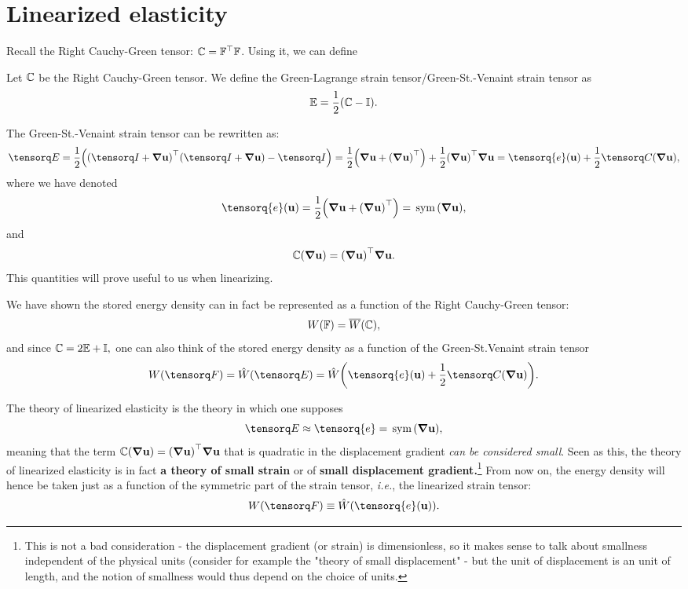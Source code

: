 \documentclass[11pt]{scrartcl} %
\begin{document}
\section{Linearized elasticity}
\label{sec:linearized_elasticity}

Recall the Right Cauchy-Green tensor: $\mathbb{C} = \mathbb{F}^\top\mathbb{F}$. Using it, we can define

\begin{theorem}
    Let $\mathbb{C}$ be the Right Cauchy-Green tensor. We define the Green-Lagrange strain tensor/Green-St.-Venaint strain tensor as
    \[
	    \mathbb{E} = \frac{1}{2}\qty(\mathbb{C} - \mathbb{I}).
    \]
\end{theorem}
\begin{remark}
    The Green-St.-Venaint strain tensor can be rewritten as:
    \[
	    \gsv = \frac{1}{2}\qty(\transpose{\qty(\identity+\grad \vb{u})}\qty(\identity + \grad \vb{u})- \identity) = \frac{1}{2}\qty(\grad \vb{u}+\transpose{\qty(\grad \vb{u})})+ \frac{1}{2}\transpose{\qty(\grad \vb{u})}\grad \vb{u} = \tensorq{e}\qty(\vb{u}) + \frac{1}{2}\rcg\qty(\grad \vb{u}),
    \]
    where we have denoted
    \[
	    \tensorq{e}\qty(\vb{u}) = \frac{1}{2}\qty(\grad \vb{u} + \transpose{\qty(\grad \vb{u})}) = \, \text{sym} \,\qty(\grad \vb{u}),
    \]
    and
    \[
	    \mathbb{C}\qty(\grad \vb{u}) = \qty(\grad \vb{u})^\top\grad \vb{u}.
    \]
    This quantities will prove useful to us when linearizing.
\end{remark}
We have shown the stored energy density can in fact be represented as a function of the Right Cauchy-Green tensor:
\[
	W\qty(\mathbb{F}) = \overline{W}\qty(\mathbb{C}),
\]
and since $\mathbb{C} = 2 \mathbb{E} + \mathbb{I},$ one can also think of the stored energy density as a function of the Green-St.Venaint strain tensor
\[
	W(\fgrad) = \hat{W}\qty(\gsv) = \hat{W}\qty(\tensorq{e}\qty(\vb{u}) + \frac{1}{2}\rcg\qty(\grad \vb{u})).
\]

The theory of linearized elasticity is the theory in which one supposes
\[
	\gsv \approx \tensorq{e} = \, \text{sym} \,\qty(\grad \vb{u}),
\]
meaning that the term $\mathbb{C}\qty(\grad \vb{u}) = \qty(\grad \vb{u})^\top \grad \vb{u}$ that is quadratic in the displacement gradient \textit{can be considered small}. Seen as this, the theory of linearized elasticity is in fact \textbf{a theory of small strain} or of \textbf{small displacement gradient.}\footnote{This is not a bad consideration - the displacement gradient (or strain) is dimensionless, so it makes sense to talk about smallness independent of the physical units (consider for example the "theory of small displacement" - but the unit of displacement is an unit of length, and the notion of smallness would thus depend on the choice of units.} From now on, the energy density will hence be taken just as a function of the symmetric part of the strain tensor, \textit{i.e.}, the linearized strain tensor:
\[
	W\qty(\fgrad) \equiv \hat{W}\qty(\tensorq{e}\qty(\vb{u})).
\]
\end{document}
